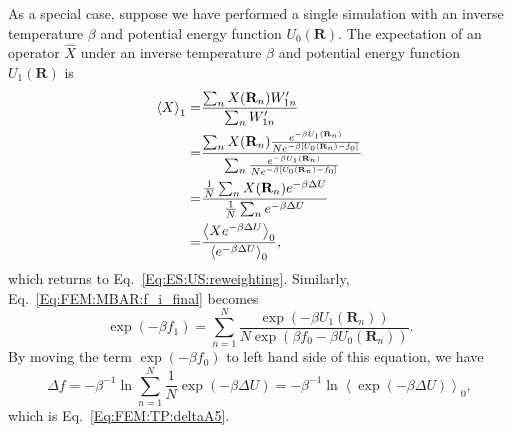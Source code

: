As a special case, suppose we have performed a single simulation with an inverse temperature $\beta$ and potential energy function $U_0(\mathbf{R})$. The expectation of an operator $\hat{X}$ under an inverse temperature $\beta$ and potential energy function $U_1(\mathbf{R})$ is
\begin{align}
	\left<X\right>_1=&\frac{\sum_n X(\mathbf{R}_n)W_{1n}^\prime}{\sum_n W_{1n}^\prime}\notag\\
	                =&\frac{\sum_n X(\mathbf{R}_n)\frac{e^{-\beta U_1(\mathbf{R}_n)}}{N e^{-\beta \left[U_0(\mathbf{R}_n)-f_0\right]}}}{\sum_n \frac{e^{-\beta U_1(\mathbf{R}_n)}}{N e^{-\beta \left[U_0(\mathbf{R}_n)-f_0\right]}}}\notag\\
	                =&\frac{\frac1N\sum_n X(\mathbf{R}_n)e^{-\beta \Delta U}}{\frac1N\sum_n e^{-\beta \Delta U}}\notag\\
	                =&\frac{\left<Xe^{-\beta \Delta U}\right>_0}{\left<e^{-\beta \Delta U}\right>_0},
\end{align}
which returns to Eq.~\ref{Eq:ES:US:reweighting}. Similarly, Eq.~\ref{Eq:FEM:MBAR:f_i_final} becomes
\begin{equation}
    \exp{(-\beta f_1)}=\sum\limits_{n=1}^N \frac{\exp{\left(-\beta U_1(\mathbf{R}_n)\right)}}{N\exp{\left(\beta f_0-\beta U_0(\mathbf{R}_n)\right)}}.
\end{equation}
By moving the term $\exp{(-\beta f_0)}$ to left hand side of this equation, we have
\begin{equation}
    \Delta f=-\beta^{-1}\ln{\sum\limits_{n=1}^N\frac{1}{N}\exp{(-\beta \Delta U)}}=-\beta^{-1}\ln{\left<\exp{(-\beta \Delta U)}\right>_0},
\end{equation}
which is Eq.~\ref{Eq:FEM:TP:deltaA5}.

